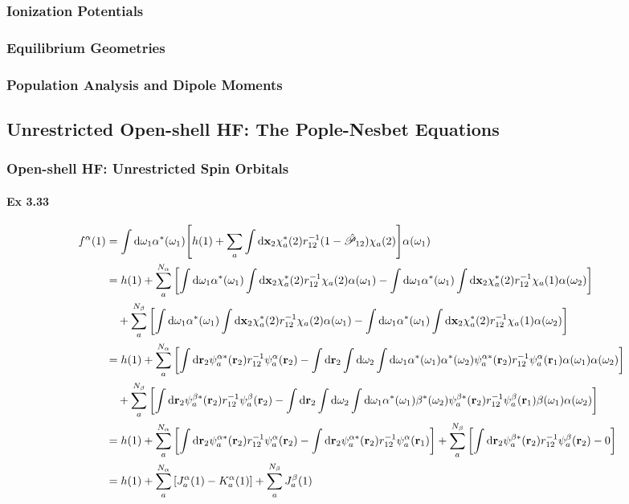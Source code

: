 \documentclass[a4paper]{article}
\newcommand{\hsP}{\hat{\mathscr{P}}}
\newcommand{\ex}[1]{\paragraph{Ex #1}}
\numberwithin{equation}{subsection}
\begin{document}
\subsubsection{Ionization Potentials}

\subsubsection{Equilibrium Geometries}

\subsubsection{Population Analysis and Dipole Moments}

\subsection{Unrestricted Open-shell HF: The Pople-Nesbet Equations}
\subsubsection{Open-shell HF: Unrestricted Spin Orbitals}
\ex{3.33}
\begin{align}
f^\alpha(1) &= \int\dd\omega_1 \alpha^*(\omega_1) 
\qty[h(1) + \sum_a\int\dd\vb{x}_2 \chi_a^*(2)r_{12}^{-1}(1-\hsP_{12})\chi_a(2)] \alpha(\omega_1) \notag\\
&= h(1) + \sum_a^{N_\alpha} 
\qty[ \int\dd\omega_1 \alpha^*(\omega_1) \int\dd\vb{x}_2 \chi_a^*(2)r_{12}^{-1}\chi_a(2) \alpha(\omega_1) 
 - \int\dd\omega_1 \alpha^*(\omega_1) \int\dd\vb{x}_2 \chi_a^*(2)r_{12}^{-1}\chi_a(1) \alpha(\omega_2) ] \notag\\
&\quad {} + \sum_a^{N_\beta}
\qty[ \int\dd\omega_1 \alpha^*(\omega_1) \int\dd\vb{x}_2 \chi_a^*(2)r_{12}^{-1}\chi_a(2) \alpha(\omega_1) 
-  \int\dd\omega_1 \alpha^*(\omega_1) \int\dd\vb{x}_2 \chi_a^*(2)r_{12}^{-1}\chi_a(1) \alpha(\omega_2) ]  \notag\\
&= h(1) + \sum_a^{N_\alpha}
\qty[\int\dd\vb{r}_2 \psi_a^{\alpha*}(\vb{r}_2) r_{12}^{-1} \psi_a^\alpha(\vb{r}_2)
- \int\dd\vb{r}_2\int\dd\omega_2\int\dd\omega_1 
\alpha^*(\omega_1)\alpha^*(\omega_2) \psi_a^{\alpha*}(\vb{r}_2) r_{12}^{-1} \psi_a^{\alpha}(\vb{r}_1) \alpha(\omega_1) \alpha(\omega_2) ] \notag\\
&\quad {} + \sum_a^{N_\beta}\qty[\int\dd\vb{r}_2 \psi_a^{\beta*}(\vb{r}_2) r_{12}^{-1} \psi_a^\beta(\vb{r}_2)
- \int\dd\vb{r}_2\int\dd\omega_2\int\dd\omega_1 
\alpha^*(\omega_1)\beta^*(\omega_2) \psi_a^{\beta*}(\vb{r}_2) r_{12}^{-1} \psi_a^{\beta}(\vb{r}_1) \beta(\omega_1) \alpha(\omega_2) ]  \notag\\
&= h(1) + \sum_a^{N_\alpha}
\qty[\int\dd\vb{r}_2 \psi_a^{\alpha*}(\vb{r}_2) r_{12}^{-1} \psi_a^\alpha(\vb{r}_2)
- \int\dd\vb{r}_2 \psi_a^{\alpha*}(\vb{r}_2) r_{12}^{-1} \psi_a^{\alpha}(\vb{r}_1) ] 
+ \sum_a^{N_\beta} \qty[\int\dd\vb{r}_2 \psi_a^{\beta*}(\vb{r}_2)r_{12}^{-1} \psi_a^\beta(\vb{r}_2) - 0 ]  \notag\\
&= h(1) + \sum_a^{N_\alpha}\qty[J_a^\alpha(1) - K_a^{\alpha}(1) ] + \sum_a^{N_\beta} J_a^\beta(1) 
\end{align}
\end{document}
